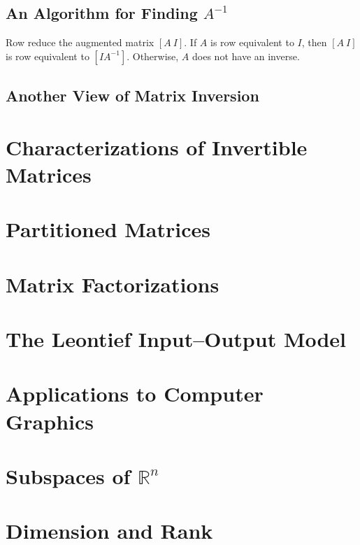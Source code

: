 \documentclass[12pt,a4paper]{article}
\begin{document}
\subsection{An Algorithm for Finding $A^{-1}$}

\begin{tcolorbox}[colback=green!5,colframe=green!40!black,title= ALGORITHM FOR FINDING $A^{-1}$]
Row reduce the augmented matrix $[ A~ I]$. If $A$ is row equivalent to $I$, then $[A ~I]$ is row equivalent to $[I A^{-1}]$. Otherwise, $A$ does not have an inverse.
\end{tcolorbox}


\subsection{Another View of Matrix Inversion}



\section{Characterizations of Invertible Matrices}



\section{Partitioned Matrices}






\section{Matrix Factorizations}






\section{The Leontief Input–Output Model}




\section{Applications to Computer Graphics}




\section{Subspaces of $\mathbb R^n$}





\section{Dimension and Rank}
\end{document}
